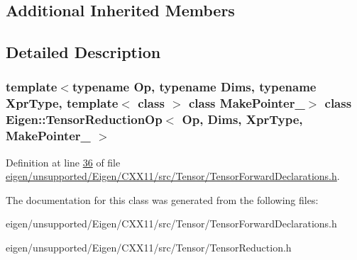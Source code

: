 \subsection*{Additional Inherited Members}


\subsection{Detailed Description}
\subsubsection*{template$<$typename Op, typename Dims, typename Xpr\+Type, template$<$ class $>$ class Make\+Pointer\+\_\+$>$\newline
class Eigen\+::\+Tensor\+Reduction\+Op$<$ Op, Dims, Xpr\+Type, Make\+Pointer\+\_\+ $>$}



Definition at line \hyperlink{eigen_2unsupported_2_eigen_2_c_x_x11_2src_2_tensor_2_tensor_forward_declarations_8h_source_l00036}{36} of file \hyperlink{eigen_2unsupported_2_eigen_2_c_x_x11_2src_2_tensor_2_tensor_forward_declarations_8h_source}{eigen/unsupported/\+Eigen/\+C\+X\+X11/src/\+Tensor/\+Tensor\+Forward\+Declarations.\+h}.



The documentation for this class was generated from the following files\+:\begin{DoxyCompactItemize}
\item 
eigen/unsupported/\+Eigen/\+C\+X\+X11/src/\+Tensor/\+Tensor\+Forward\+Declarations.\+h\item 
eigen/unsupported/\+Eigen/\+C\+X\+X11/src/\+Tensor/\+Tensor\+Reduction.\+h\end{DoxyCompactItemize}
